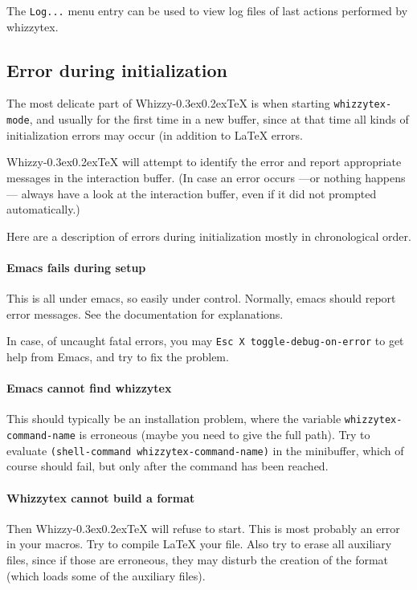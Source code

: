 \documentclass{article}
\makeatletter
\let \lst \verb
\def \whizzy {{Whizzy\kern -0.3ex\raise 0.2ex\hbox{\let \@\relax\TeX}}}
\makeatother
\begin{document}
The {\tt Log...} menu entry can be used to view log files of
last actions performed by whizzytex. 

\subsection {Error during initialization}

The most delicate part of {\whizzy} is when starting {\tt whizzytex-mode},
and usually for the first time in a new buffer, since at that time all kinds
of initialization errors may occur (in addition to {\LaTeX} errors. 

{\whizzy} will attempt to identify the error and report appropriate messages
in the interaction buffer. (In case an error occurs ---or nothing happens---
always have a look at the interaction buffer, even if it did not prompted
automatically.)

Here are a description of errors during initialization mostly in
chronological order. 

\paragraph {Emacs fails during setup}

This is all under emacs, so easily under control.
Normally, emacs should report error messages. See the documentation for
explanations. 

In case, of uncaught fatal errors, you may
\verb"Esc X toggle-debug-on-error" to get help from Emacs, and try to fix
the problem. 

\paragraph {Emacs cannot find whizzytex}

This should typically be an installation problem, where the variable
\lst"whizzytex-command-name" is erroneous (maybe you need to give the full
path). Try to evaluate \verb"(shell-command whizzytex-command-name)" in the
minibuffer, which of course should fail, but only after the command has been
reached.

\paragraph {Whizzytex cannot build a format}

Then {\whizzy} will refuse to start.  This is most probably an error in your
macros.  Try to compile {\LaTeX} your file.  
Also try to erase all auxiliary files, since if those are erroneous, they
may disturb the creation of the format (which loads some of the auxiliary
files). 
\end{document}
